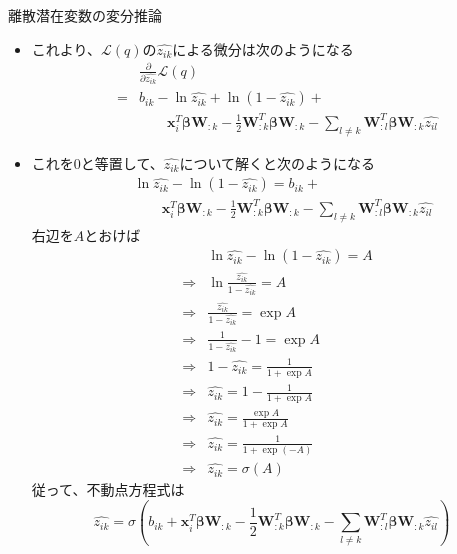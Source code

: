 \documentclass[dvipdfmx,notheorems,t]{beamer}
\begin{document}
\begin{frame}{離散潜在変数の変分推論}
\begin{itemize}
\begin{itemize}
		\item これより、$\mathcal{L}(q)$の$\widehat{z_{ik}}$による微分は次のようになる
		\begin{eqnarray}
			&& \frac{\partial}{\partial \widehat{z_{ik}}} \mathcal{L}(q) \nonumber \\
			&=& b_{ik} - \ln \widehat{z_{ik}} + \ln (1 - \widehat{z_{ik}}) + \nonumber \\
			&& \qquad \bm{x}_i^T \bm{\beta} \bm{W}_{:k} - \frac{1}{2} \bm{W}_{:k}^T \bm{\beta} \bm{W}_{:k} - \sum_{l \neq k} \bm{W}_{:l}^T \bm{\beta} \bm{W}_{:k} \widehat{z_{il}}
		\end{eqnarray}
		
		\item これを$0$と等置して、$\widehat{z_{ik}}$について解くと次のようになる
		\begin{eqnarray}
			&& \ln \widehat{z_{ik}} - \ln (1 - \widehat{z_{ik}}) = b_{ik} + \nonumber \\
			&& \qquad \bm{x}_i^T \bm{\beta} \bm{W}_{:k} - \frac{1}{2} \bm{W}_{:k}^T \bm{\beta} \bm{W}_{:k} - \sum_{l \neq k} \bm{W}_{:l}^T \bm{\beta} \bm{W}_{:k} \widehat{z_{il}}
		\end{eqnarray}
		右辺を$A$とおけば
		\begin{eqnarray}
			&& \ln \widehat{z_{ik}} - \ln (1 - \widehat{z_{ik}}) = A \\
			&\Rightarrow& \ln \frac{\widehat{z_{ik}}}{1 - \widehat{z_{ik}}} = A \nonumber \\
			&\Rightarrow& \frac{\widehat{z_{ik}}}{1 - \widehat{z_{ik}}} = \exp A \nonumber \\
			&\Rightarrow& \frac{1}{1 - \widehat{z_{ik}}} - 1 = \exp A \nonumber \\
			&\Rightarrow& 1 - \widehat{z_{ik}} = \frac{1}{1 + \exp A} \nonumber \\
			&\Rightarrow& \widehat{z_{ik}} = 1 - \frac{1}{1 + \exp A} \nonumber \\
			&\Rightarrow& \widehat{z_{ik}} = \frac{\exp A}{1 + \exp A} \nonumber \\
			&\Rightarrow& \widehat{z_{ik}} = \frac{1}{1 + \exp (-A)} \\
			&\Rightarrow& \widehat{z_{ik}} = \sigma(A)
		\end{eqnarray}
		従って、不動点方程式は
		\begin{equation}
			\widehat{z_{ik}} = \sigma \left( b_{ik} + \bm{x}_i^T \bm{\beta} \bm{W}_{:k} - \frac{1}{2} \bm{W}_{:k}^T \bm{\beta} \bm{W}_{:k} - \sum_{l \neq k} \bm{W}_{:l}^T \bm{\beta} \bm{W}_{:k} \widehat{z_{il}} \right)
		\end{equation}
	\end{itemize} \
	

\end{itemize}
\end{frame}
\end{document}
